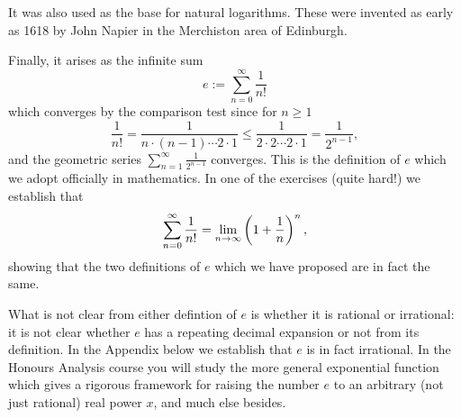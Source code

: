 \documentclass[11pt,dvipsnames]{book}
\numberwithin{equation}{section} %
\numberwithin{figure}{section} %
\numberwithin{table}{section} %
\begin{document}
It was also used as the base for natural logarithms. These were invented as early as 1618 by John Napier in the Merchiston area of Edinburgh.

Finally, it arises as the infinite sum
\[ e := \sum_{n=0}^\infty \frac{1}{n!}\]
which converges by the comparison test since for $n \geq 1$
\[
\frac{1}{n!}=\frac{1}{n\cdot (n-1)\cdots 2\cdot 1}\leq \frac{1}{2\cdot 2\cdots 2\cdot 1 } = \frac{1}{2^{n-1}},
\]
and the geometric series $\sum_{n=1}^{\infty}\frac{1}{2^{n-1}}$ converges. This is the definition of $e$ which we adopt officially in mathematics. In one of the exercises (quite hard!) we establish that 
\[ 
\sum_{n=0}^\infty \frac{1}{n!} = \lim_{n\rightarrow\infty} \left(1 + \frac{1}{n}\right)^n,\]
showing that the two definitions of $e$ which we have proposed are in fact the same.

What is not clear from either defintion of $e$ is whether it is rational or irrational: it is not clear whether $e$ has a repeating decimal expansion or not from its definition. In the Appendix below we establish that $e$ is in fact irrational.
In the Honours Analysis course you will study the more general exponential function which gives a rigorous framework for raising the number $e$ to an arbitrary (not just rational) real power $x$, and much else besides.

%
%
%
%
\end{document}
